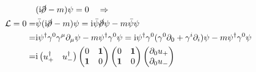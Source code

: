 \documentclass{article}
\begin{document}
$$
  \begin{aligned}
                                                                            & (\mathrm{i}\cancel{\partial}-m)\psi=0\quad\Rightarrow                                                                                                                                              \\
    \mathcal{L}=0=                                                          & \bar{\psi}(\mathrm{i}\cancel{\partial}-m)\psi=\mathrm{i}\bar{\psi}\cancel{\partial}\psi-m\bar{\psi}\psi                                                                                            \\
    =                                                                       & \mathrm{i}\psi^{\dagger}\gamma^0\gamma^\mu\partial_{\mu}\psi-m\psi^{\dagger}\gamma^0\psi=\mathrm{i}\psi^{\dagger}\gamma^0(\gamma^0\partial_0+\gamma^i\partial_{i})\psi-m\psi^{\dagger}\gamma^0\psi \\
    =                                                                       & \mathrm{i}\begin{pmatrix}
                                                                                          u_+^{\dagger} & u_-^{\dagger}
                                                                                        \end{pmatrix}\begin{pmatrix}
                                                                                                       0 & \bf{1} \\\bf{1} & 0
                                                                                                     \end{pmatrix}\begin{pmatrix}
                                                                                                                    0 & \bf{1} \\\bf{1} & 0
                                                                                                                  \end{pmatrix}\begin{pmatrix}
                                                                                                                                 \partial_0u_+ \\\partial_0u_-
                                                                                                                               \end{pmatrix}

\end{aligned}$$
\end{document}
